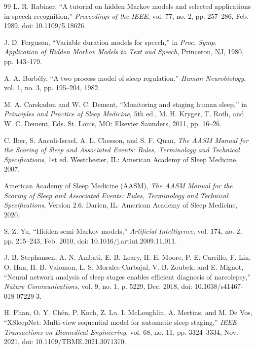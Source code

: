 \documentclass[11pt,a4paper]{article}
\begin{document}
\begin{thebibliography}{99}
 L. R. Rabiner, ``A tutorial on hidden Markov models and selected applications in speech recognition,'' \textit{Proceedings of the IEEE}, vol. 77, no. 2, pp. 257--286, Feb. 1989, doi: 10.1109/5.18626.

 J. D. Ferguson, ``Variable duration models for speech,'' in \textit{Proc. Symp. Application of Hidden Markov Models to Text and Speech}, Princeton, NJ, 1980, pp. 143--179.

 A. A. Borbély, ``A two process model of sleep regulation,'' \textit{Human Neurobiology}, vol. 1, no. 3, pp. 195--204, 1982.

 M. A. Carskadon and W. C. Dement, ``Monitoring and staging human sleep,'' in \textit{Principles and Practice of Sleep Medicine}, 5th ed., M. H. Kryger, T. Roth, and W. C. Dement, Eds. St. Louis, MO: Elsevier Saunders, 2011, pp. 16--26.

 C. Iber, S. Ancoli-Israel, A. L. Chesson, and S. F. Quan, \textit{The AASM Manual for the Scoring of Sleep and Associated Events: Rules, Terminology and Technical Specifications}, 1st ed. Westchester, IL: American Academy of Sleep Medicine, 2007.

 American Academy of Sleep Medicine (AASM), \textit{The AASM Manual for the Scoring of Sleep and Associated Events: Rules, Terminology and Technical Specifications}, Version 2.6. Darien, IL: American Academy of Sleep Medicine, 2020.

 S.-Z. Yu, ``Hidden semi-Markov models,'' \textit{Artificial Intelligence}, vol. 174, no. 2, pp. 215--243, Feb. 2010, doi: 10.1016/j.artint.2009.11.011.

 J. B. Stephansen, A. N. Ambati, E. B. Leary, H. E. Moore, P. E. Carrillo, F. Lin, O. Han, H. B. Valomon, L. S. Morales-Carbajal, V. B. Zoubek, and E. Mignot, ``Neural network analysis of sleep stages enables efficient diagnosis of narcolepsy,'' \textit{Nature Communications}, vol. 9, no. 1, p. 5229, Dec. 2018, doi: 10.1038/s41467-018-07229-3.

 H. Phan, O. Y. Chén, P. Koch, Z. Lu, I. McLoughlin, A. Mertins, and M. De Vos, ``XSleepNet: Multi-view sequential model for automatic sleep staging,'' \textit{IEEE Transactions on Biomedical Engineering}, vol. 68, no. 11, pp. 3324--3334, Nov. 2021, doi: 10.1109/TBME.2021.3071370.


\end{thebibliography}
\end{document}
